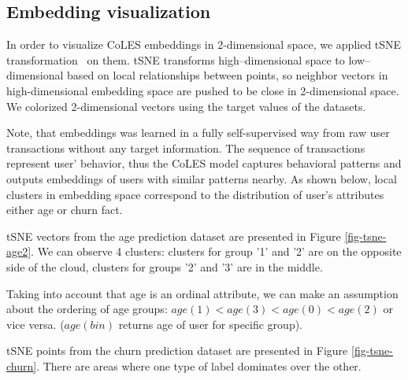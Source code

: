\documentclass[sigconf, anonymous]{acmart}
\begin{document}
\fi

\iffalse

\subsection{Embedding visualization} \label{app-sec-vis}

In order to visualize CoLES embeddings in 2-dimensional space, we applied tSNE transformation~\citep{Maaten2008VisualizingDU} on them. tSNE transforms high--dimensional space to low--dimensional based on local relationships between points, so neighbor vectors in high-dimensional embedding space are pushed to be close in 2-dimensional space. We colorized 2-dimensional vectors using the target values of the datasets.

Note, that embeddings was learned in a fully self-supervised way from raw user transactions without any target information. The sequence of transactions represent user' behavior, thus the CoLES model captures behavioral patterns and outputs embeddings of users with similar patterns nearby.
As shown below, local clusters in embedding space correspond to the distribution of user's attributes either age or churn fact.

tSNE vectors from the age prediction dataset are presented in Figure \ref{fig-tsne-age2}. We can observe 4 clusters: clusters for group '1' and '2' are on the opposite side of the cloud, clusters for groups '2' and '3' are in the middle.

Taking into account that age is an ordinal attribute, we can make an assumption about the ordering of age groups: $age(1) < age(3) < age(0) < age(2)$ or vice versa. ($age(bin)$ returns age of user for specific group).

tSNE points from the churn prediction dataset are presented in Figure \ref{fig-tsne-churn}. There are areas where one type of label dominates over the other.
\end{document}
